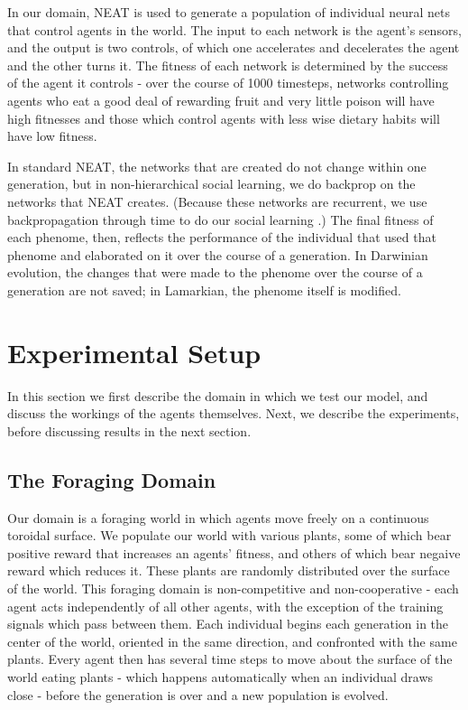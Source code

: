 \documentclass{acm_proc_article-sp}
\begin{document}
In our domain, NEAT is used to generate a population of individual neural nets that control agents in the world.  The input to each network is the agent's sensors, and the output is two controls, of which one accelerates and decelerates the agent and the other turns it.  The fitness of each network is determined by the success of the agent it controls - over the course of 1000 timesteps, networks controlling agents who eat a good deal of rewarding fruit and very little poison will have high fitnesses and those which control agents with less wise dietary habits will have low fitness.

In standard NEAT, the networks that are created do not change within one generation, but in non-hierarchical social learning, we do backprop on the networks that NEAT creates. (Because these networks are recurrent, we use backpropagation through time to do our social learning \cite{werbos1990backpropagation}.)  The final fitness of each phenome, then, reflects the performance of the individual that used that phenome and elaborated on it over the course of a generation. In Darwinian evolution, the changes that were made to the phenome over the course of a generation are not saved; in Lamarkian, the phenome itself is modified.

\section{Experimental Setup}
\label{sec:setup}
In this section we first describe the domain in which we test our model, and discuss the workings of the agents themselves.  Next, we describe the experiments, before discussing results in the next section.

\subsection*{The Foraging Domain} 
    Our domain is a foraging world in which agents move freely on a continuous toroidal surface.  We populate our world with various plants, some of which bear positive reward that increases an agents' fitness, and others of which bear negaive reward which reduces it. These plants are randomly distributed over the surface of the world. This foraging domain is non-competitive and non-cooperative - each agent acts independently of all other agents, with the exception of the training signals which pass between them. Each individual begins each generation in the center of the world, oriented in the same direction, and confronted with the same plants. Every agent then has several time steps to move about the surface of the world eating plants - which happens automatically when an individual draws close - before the generation is over and a new population is evolved. 
    
\end{document}
